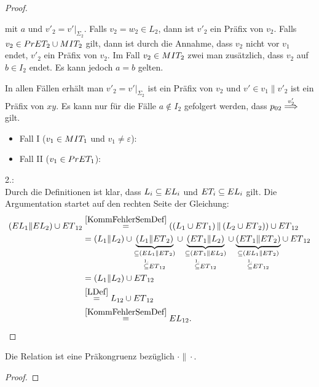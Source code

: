 \begin{proof}
\begin{itemize}
      mit $a$ und $v'_2=v'|_{\Sigma _2}$. Falls $v_2=w_2\in L_2$, dann ist
      $v'_2$ ein Präfix von $v_2$. Falls $v_2\in PrET _2\cup MIT _2$ gilt,
      dann ist durch die Annahme, dass $v_2$ nicht vor $v_1$ endet, $v'_2$ ein
      Präfix von $v_2$. Im Fall $v_2 \in MIT _2$ zwei man zusätzlich, dass
      $v_2$ auf $b\in I_2$ endet. Es kann jedoch $a=b$ gelten.
  \end{itemize}
  In allen Fällen erhält man $v'_2=v'|_{\Sigma _2}$ ist ein Präfix von $v_2$
  und $v'\in v_1\|v'_2$ ist ein Präfix von $xy$. Es kann nur für die Fälle
  $a\notin I_2$ gefolgert werden, dass $p_{02} \weakmust[v'_2]$ gilt.
  \begin{itemize}
    \item Fall I ($v_1\in MIT _1$ und $v_1\neq \varepsilon$): 
    \item Fall II ($v_1\in PrET _1$): 
  \end{itemize}

  2.:\\
  Durch die Definitionen ist klar, dass $L_i\subseteq EL _i$ und $ET
  _i\subseteq EL _i$ gilt. Die Argumentation startet auf den rechten Seite der
  Gleichung:
  \begin{align*}
    (EL{}_1\| EL{}_2)\cup
    ET{}_{12}&\overset{\ref{KommFehlerSemDef}}{=}\left(\left(L_1\cup
    ET{}_1\right)\|\left(L_2\cup ET{}_2\right)\right)\cup ET{}_{12}\\
    &=(L_1\|L_2) \cup \underset{\overset{1.}{\subseteq}
    ET{}_{12}}{\underset{\subseteq
    (EL{}_1\|ET{}_2)}{\underbrace{(L_1\|ET{}_2)}}} \cup
    \underset{\overset{1.}{\subseteq} ET{}_{12}}{\underset{\subseteq
    (ET{}_1\|EL{}_2)}{\underbrace{(ET{}_1\|L_2)}}} \cup
    \underset{\overset{1.}{\subseteq} ET{}_{12}}{\underset{\subseteq
    (EL{}_1\|ET{}_2)}{\underbrace{(ET{}_1\|ET{}_2)}}} \cup ET{}_{12}\\
    &=(L_1\|L_2) \cup ET{}_{12}\\
    &\overset{\ref{LDef}}{=}L_{12}\cup ET{}_{12}\\
    &\overset{\ref{KommFehlerSemDef}}{=}EL{}_{12}.
  \end{align*}
\end{proof}

\begin{Kor}
  Die Relation \ERel{} ist eine Präkongruenz bezüglich $\cdot\|\cdot$.
\end{Kor}
\begin{proof}
\end{proof}

